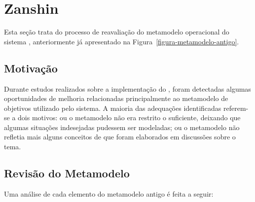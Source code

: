 
\chapter{Zanshin}
\label{sec-zanshin}

Esta seção trata do processo de reavaliação do metamodelo operacional do sistema \zanshin, anteriormente já apresentado na Figura~\ref{figura-metamodelo-antigo}.

\section{Motivação}
\label{sec-zanshin-motivacao}
Durante estudos realizados sobre a implementação do \framework \zanshin, foram detectadas algumas oportunidades de melhoria relacionadas principalmente ao metamodelo de objetivos utilizado pelo sistema. A maioria das adequações identificadas referem-se a dois motivos: ou o metamodelo não era restrito o suficiente, deixando que algumas situações indesejadas pudessem ser modeladas; ou o metamodelo não refletia mais alguns conceitos de \gore que foram elaborados em discussões sobre o tema. 

\section{Revisão do Metamodelo}
\label{sec-zanshin-revisao}
Uma análise de cada elemento do metamodelo antigo é feita a seguir:

